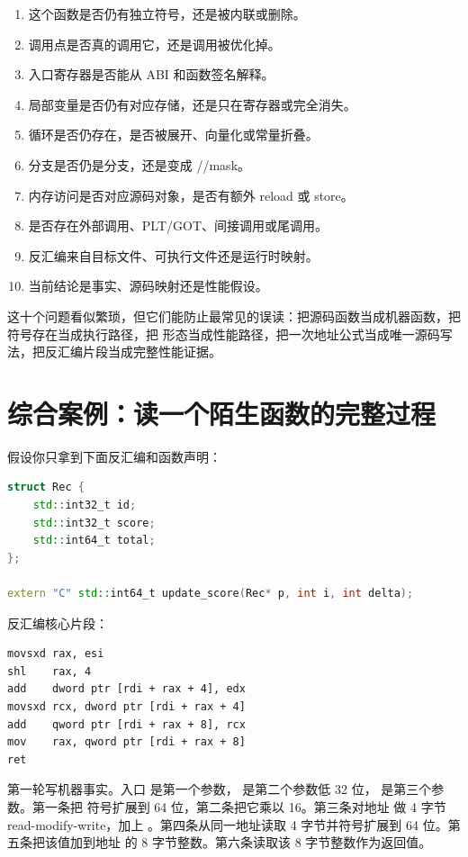 \begin{enumerate}
  \item 这个函数是否仍有独立符号，还是被内联或删除。
  \item 调用点是否真的调用它，还是调用被优化掉。
  \item 入口寄存器是否能从 ABI 和函数签名解释。
  \item 局部变量是否仍有对应存储，还是只在寄存器或完全消失。
  \item 循环是否仍存在，是否被展开、向量化或常量折叠。
  \item 分支是否仍是分支，还是变成 //mask。
  \item 内存访问是否对应源码对象，是否有额外 reload 或 store。
  \item 是否存在外部调用、PLT/GOT、间接调用或尾调用。
  \item 反汇编来自目标文件、可执行文件还是运行时映射。
  \item 当前结论是事实、源码映射还是性能假设。
\end{enumerate}

这十个问题看似繁琐，但它们能防止最常见的误读：把源码函数当成机器函数，把符号存在当成执行路径，把  形态当成性能路径，把一次地址公式当成唯一源码写法，把反汇编片段当成完整性能证据。

\section{综合案例：读一个陌生函数的完整过程}

假设你只拿到下面反汇编和函数声明：

\begin{lstlisting}[language=C++]
struct Rec {
    std::int32_t id;
    std::int32_t score;
    std::int64_t total;
};

extern "C" std::int64_t update_score(Rec* p, int i, int delta);
\end{lstlisting}

反汇编核心片段：

\begin{lstlisting}
movsxd rax, esi
shl    rax, 4
add    dword ptr [rdi + rax + 4], edx
movsxd rcx, dword ptr [rdi + rax + 4]
add    qword ptr [rdi + rax + 8], rcx
mov    rax, qword ptr [rdi + rax + 8]
ret
\end{lstlisting}

第一轮写机器事实。入口  是第一个参数， 是第二个参数低 32 位， 是第三个参数。第一条把  符号扩展到 64 位，第二条把它乘以 16。第三条对地址  做 4 字节 read-modify-write，加上 。第四条从同一地址读取 4 字节并符号扩展到 64 位。第五条把该值加到地址  的 8 字节整数。第六条读取该 8 字节整数作为返回值。

